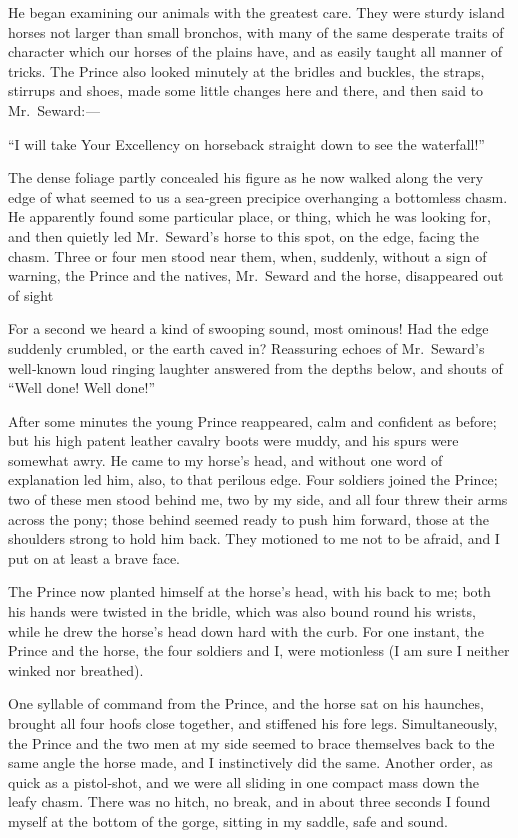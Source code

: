 \documentclass[12pt]{book}
\begin{document}
He began examining our animals with the greatest care. They were sturdy
island horses not larger than small bronchos, with many of the same desperate
traits of character which our horses of the plains have, and as easily taught all
manner of tricks. The Prince also looked minutely at the bridles and buckles, the
straps, stirrups and shoes, made some little changes here and there, and then said
to Mr.~Seward: —

“I will take Your Excellency on horseback straight down to see the waterfall!”

The dense foliage partly concealed his figure as he now walked along the very
edge of what seemed to us a sea‐green precipice overhanging a bottomless chasm.
He apparently found some particular place, or thing, which he was looking for,
and then quietly led Mr.~Seward’s horse to this spot, on the edge, facing the chasm.
Three or four men stood near them, when, suddenly, without a sign of warning,
the Prince and the natives, Mr.~Seward and the horse, disappeared out of sight

For a second we heard a kind of swooping sound, most ominous! Had the edge
suddenly crumbled, or the earth caved in? Reassuring echoes of Mr.~Seward’s
well‐known loud ringing laughter answered from the depths below, and shouts
of “Well done! Well done!”

After some minutes the young Prince reappeared, calm and confident as
before; but his high patent leather cavalry boots were muddy, and his spurs
were somewhat awry. He came to my horse’s head, and without one word of
explanation led him, also, to that perilous edge. Four soldiers joined the Prince;
two of these men stood behind me, two by my side, and all four threw their arms
across the pony; those behind seemed ready to push him forward, those at the
shoulders strong to hold him back. They motioned to me not to be afraid, and I
put on at least a brave face.

The Prince now planted himself at the horse’s head, with his back to me; both
his hands were twisted in the bridle, which was also bound round his wrists,
while he drew the horse’s head down hard with the curb. For one instant, the
Prince and the horse, the four soldiers and I, were motionless (I am sure I neither
winked nor breathed).

One syllable of command from the Prince, and the horse sat on his haunches,
brought all four hoofs close together, and stiffened his fore legs. Simultaneously,
the Prince and the two men at my side seemed to brace themselves back to the
same angle the horse made, and I instinctively did the same. Another order, as
quick as a pistol‐shot, and we were all sliding in one compact mass down the
leafy chasm. There was no hitch, no break, and in about three seconds I found
myself at the bottom of the gorge, sitting in my saddle, safe and sound.
\end{document}

